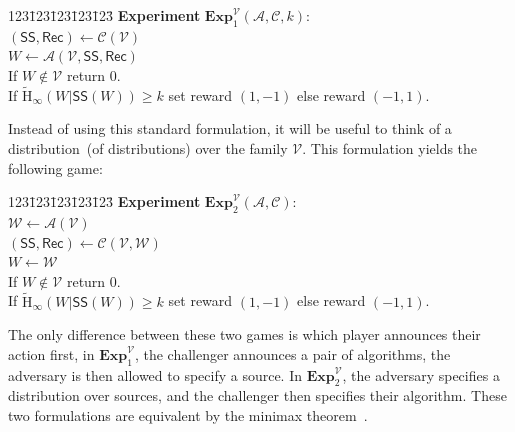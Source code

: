 \documentclass[11pt]{article}
\newcommand{\class}[1]{{\ensuremath{\mathsf{#1}}}}
\newcommand{\sketch}{\ensuremath{\class{SS}}\xspace}
\newcommand{\rec}{\ensuremath{\class{Rec}}\xspace}
\newcommand{\Hav}{\tilde{\mathrm{H}}_\infty}
\newcommand{\Exp}{\mathbf{Exp}}
\begin{document}
\begin{center}
\begin{minipage}{1in}
\begin{tabbing}
123\=123\=123\=123\=123\=\kill
\textbf{Experiment} $\Exp^{\mathcal{V}}_1(\mathcal{A}, \mathcal{C}, k)$: \\
$(\sketch, \rec)\leftarrow \mathcal{C}(\mathcal{V})$\\
$W \leftarrow \mathcal{A}(\mathcal{V}, \sketch, \rec)$\\
If $W\not\in \mathcal{V}$ return $0$.\\
If $\Hav(W | \sketch(W))\ge k$ set reward $(1, -1)$ else reward $(-1, 1)$.
\end{tabbing} \end{minipage} 
\end{center}

Instead of using this standard formulation, it will be useful to think of a distribution~(of distributions) over the family $\mathcal{V}$.  This formulation yields the following game:

\begin{center}
\begin{minipage}{1in}
\begin{tabbing}
123\=123\=123\=123\=123\=\kill
\textbf{Experiment} $\Exp^{\mathcal{V}}_2(\mathcal{A}, \mathcal{C})$: \\
$\mathcal{W} \leftarrow \mathcal{A}(\mathcal{V})$\\
$(\sketch, \rec)\leftarrow \mathcal{C}(\mathcal{V}, \mathcal{W})$\\
$W \leftarrow \mathcal{W}$\\
If $W\not\in \mathcal{V}$ return $0$.\\
If $\Hav(W | \sketch(W))\ge k$ set reward $(1, -1)$ else reward $(-1, 1)$.
\end{tabbing} \end{minipage} 
\end{center}

The only difference between these two games is which player announces their action first, in $\Exp^{\mathcal{V}}_1$, the challenger announces a pair of algorithms, the adversary is then allowed to specify a source.  In $\Exp^{\mathcal{V}}_2$, the adversary specifies a distribution over sources, and the challenger then specifies their algorithm.  These two formulations are equivalent by the minimax theorem~\cite{neumann1928theorie}.
\end{document}

